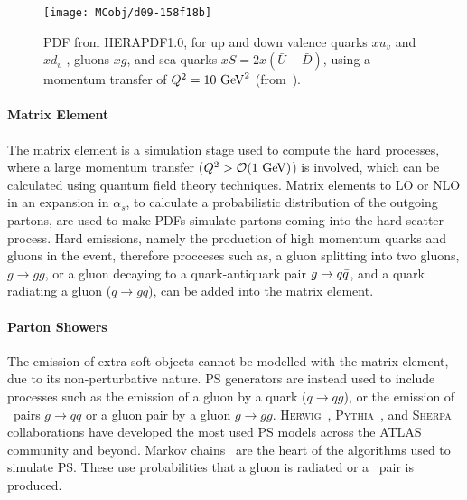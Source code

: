 				\begin{figure}[!htb]
					\centering
					\texttt{[image: MCobj/d09-158f18b]}
					\caption{\label{fig:HERAPDF} PDF from \textsc{HERAPDF1.0}, for up and down valence quarks $xu_v$ and $xd_v$ , gluons $xg$, and sea quarks $xS = 2x(\bar{U} + \bar{D})$, using a momentum transfer of $Q^2 =10 \GeV^2$ (from~\cite{Aaron:2009aa}).}
				\end{figure}

			\paragraph*{Matrix Element}

				The matrix element is a simulation stage used to compute the hard processes, where a large momentum transfer ($Q^2 > \mathcal{O}(1 \GeV)$) is involved, which can be calculated using quantum field theory techniques. Matrix elements to \ac{LO} or \ac{NLO} in an expansion in $\alpha_s$, to calculate a probabilistic distribution of the outgoing partons, are used to make \ac{PDFs} simulate partons coming into the hard scatter process. Hard emissions, namely the production of high momentum quarks and gluons in the event, therefore procceses such as, a gluon splitting into two gluons, $g \to gg$, or a gluon decaying to a quark-antiquark pair $g \rightarrow q\bar{q}$, and a quark radiating a gluon ($q \to gq$), can be added into the matrix element.

			\paragraph*{Parton Showers}

				The emission of extra soft objects cannot be modelled with the matrix element, due to its non-perturbative nature. \ac{PS} generators are instead used to include processes such as the emission of a gluon by a quark ($q \to qg$), or the emission of \qqbar\ pairs $g \to qq$ or a gluon pair by a gluon $g \to gg$. \textsc{Herwig}~\cite{Herwig2001}, \textsc{Pythia}~\cite{Pythia2006}, and \textsc{Sherpa}~\cite{Sherpa} collaborations have developed the most used \ac{PS} models across the \ac{ATLAS} community and beyond. Markov chains~\cite{Berg2004} are the heart of the algorithms used to simulate \ac{PS}. These use probabilities that a gluon is radiated or a \qqbar\ pair is produced. %

